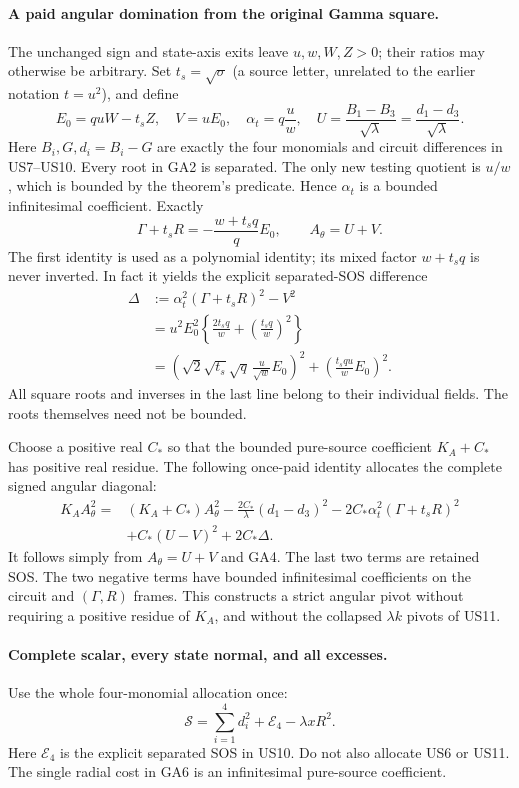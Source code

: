 \paragraph{A paid angular domination from the original Gamma square.}
The unchanged sign and state-axis exits leave $u,w,W,Z>0$; their
ratios may otherwise be arbitrary. Set $t_s=\sqrt\sigma$ (a source
letter, unrelated to the earlier notation $t=u^2$), and define
\[
 E_0=quW-t_s Z,\quad V=uE_0,\quad
 \alpha_t=q\frac uw,\quad
 U=\frac{B_1-B_3}{\sqrt\lambda}
   =\frac{d_1-d_3}{\sqrt\lambda}.
 \tag{GA2}
\]
Here $B_i,G,d_i=B_i-G$ are exactly the four monomials and circuit
differences in US7--US10. Every root in GA2 is separated. The only
new testing quotient is $u/w$, which is bounded by the theorem's
predicate. Hence $\alpha_t$ is a bounded infinitesimal coefficient.
Exactly
\[
 \Gamma+t_sR=-\frac{w+t_sq}{q}E_0,
 \qquad A_\theta=U+V.
 \tag{GA3}
\]
The first identity is used as a polynomial identity; its mixed
factor $w+t_sq$ is never inverted. In fact it yields the explicit
separated-SOS difference
\[
\begin{split}
 \Delta&:=\alpha_t^2(\Gamma+t_sR)^2-V^2\\
 &=u^2E_0^2\left\{\frac{2t_sq}{w}
                            +\left(\frac{t_sq}{w}\right)^2\right\}\\
 &=\left(\sqrt2\sqrt{t_s}\sqrt q\,
                  \frac{u}{\sqrt w}E_0\right)^2
   +\left(\frac{t_squ}{w}E_0\right)^2.
\end{split}\tag{GA4}
\]
All square roots and inverses in the last line belong to their
individual fields. The roots themselves need not be bounded.

Choose a positive real $C_*$ so that the bounded pure-source
coefficient $K_A+C_*$ has positive real residue. The following
once-paid identity allocates the complete signed angular diagonal:
\[
\boxed{\begin{aligned}
 K_AA_\theta^2={}&(K_A+C_*)A_\theta^2
  -\frac{2C_*}{\lambda}(d_1-d_3)^2
  -2C_*\alpha_t^2(\Gamma+t_sR)^2\\
 &+C_*(U-V)^2+2C_*\Delta.
\end{aligned}}\tag{GA5}
\]
It follows simply from $A_\theta=U+V$ and GA4. The last two terms
are retained SOS. The two negative terms have bounded
infinitesimal coefficients on the circuit and $(\Gamma,R)$ frames.
This constructs a strict angular pivot without requiring a positive
residue of $K_A$, and without the collapsed $\lambda k$ pivots of
US11.

\paragraph{Complete scalar, every state normal, and all excesses.}
Use the whole four-monomial allocation once:
\[
       \mathscr S=\sum_{i=1}^4d_i^2+\mathcal E_4
                                           -\lambda xR^2.
       \tag{GA6}
\]
Here $\mathcal E_4$ is the explicit separated SOS in US10. Do not
also allocate US6 or US11. The single radial cost in GA6 is an
infinitesimal pure-source coefficient.

